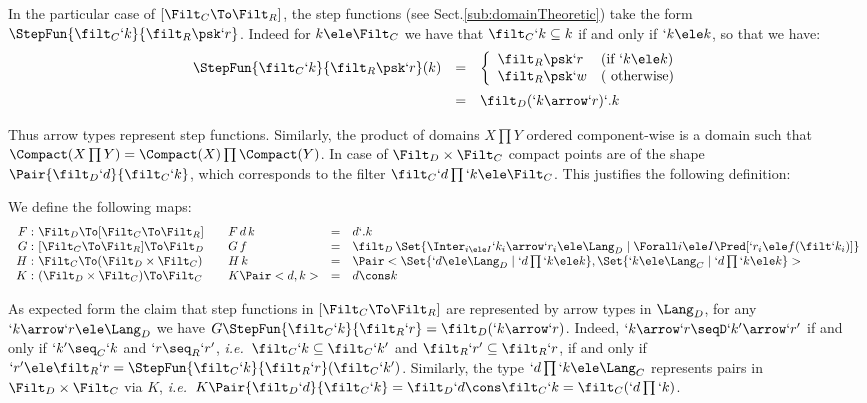 \documentclass{CSML}
\def\ie{\emph{i.e.}}
\begin{document}

In the particular case of $[\Filt_C\To\Filt_R]$, the step functions (see Sect.\skp\ref{sub:domainTheoretic}) take the form $\StepFun{\filt_C `k }{ \filt_R \psk `r}$. 
Indeed for $k \ele \Filt_C$ we have that $\filt_C `k \subseteq k$ if and only if
$`k \ele k$, so that
we have:
%
 \[ \begin{array}{lll}
 \StepFun{\filt_C `k }{ \filt_R \psk `r} (k) & = &
 \left\{
 \begin{array}{ll}
 \filt_R\psk `r & (\textrm{if }`k \ele k ) \\
 \filt_R\psk `w & (\textrm{ otherwise})
 \end{array} \right. \\ [4mm]
& = &
 \filt_D(`k\arrow `r)`.k
 \end{array} \]


Thus arrow types represent step functions. Similarly, the product of domains $X\prod Y$ ordered component-wise is a domain such that $\Compact(X\prod Y) = \Compact(X)\prod \Compact(Y)$. 
In case of $\Filt_D \times \Filt_C$ compact points are of the shape $\Pair{\filt_D`d }{ \filt_C`k }$, which corresponds to 
the filter $\filt_C `d\prod `k \ele \Filt_C$.
This justifies the following definition:

 \begin{defi} \label{def:iso-maps}
We define the following maps:
%
 \[ \begin{array}{r@{~}l@{\qquad}lcl}
F:& \Filt_D \To [ \Filt_C\To\Filt_R] &
F \, d \, k &=& d `. k 
	\\
G:&[ \Filt_C\To\Filt_R] \To \Filt_D &
G \, f &=& \filt_D\,\Set{\Inter_{i \ele I} `k_i\arrow `r_i \ele \Lang_D \mid \Forall i \ele I \Pred[ `r_i \ele f(\filt `k_i) ] } 
	\\
H:& \Filt_C \To (\Filt_D \times \Filt_C) &
H \, k &=& \Pair< \Set{`d \ele \Lang_D \mid `d\prod `k \ele k } , \Set{`k \ele \Lang_C \mid `d\prod `k \ele k } >
	\\
K:&(\Filt_D \times \Filt_C) \To \Filt_C &
K \Pair<d,k> &=& d \cons k 
 \end{array} \]
 \end{defi}

 \begin{rem} \label{rem:GK}
As expected form the claim that step functions in $[ \Filt_C\To\Filt_R]$ are represented by arrow types in $\Lang_D$, for any $`k\arrow `r \ele \Lang_D$ we have $G\StepFun{\filt_C`k}{\filt_R`r} = \filt_D(`k\arrow `r )$. 
Indeed, $`k\arrow `r \seqD `k'\arrow `r'$ if and only if $`k'\seq_C`k$ and $`r\seq_R`r'$, \ie~$\filt_C`k\subseteq\filt_C`k'$ and $\filt_R`r'\subseteq\filt_R`r$, %
if and only if $`r' \ele \filt_R`r = \StepFun{\filt_C`k}{\filt_R`r}(\filt_C`k')$.
%
Similarly, the type $`d\prod`k\ele \Lang_C$ represents pairs in $\Filt_D \times \Filt_C$ via $K$, \ie~$K\Pair{\filt_D`d}{\filt_C`k} = \filt_D`d \cons \filt_C`k = \filt_C(`d\prod`k)$.
 \end{rem}
\end{document}
